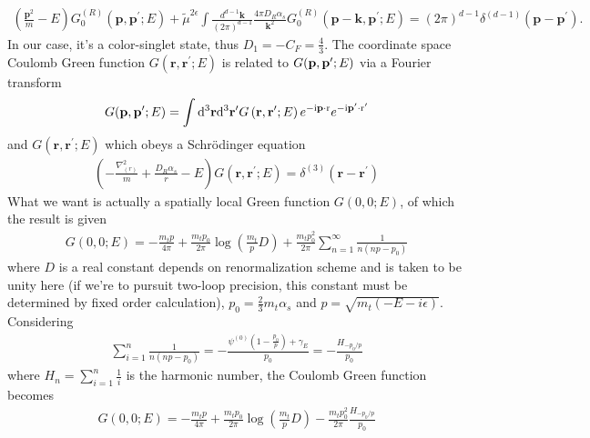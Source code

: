 \documentclass[english,aps,prd,preprint,showpacs,superscriptaddress,groupedaddress,fixfloats]{revtex4-1}
\begin{document}
\begin{align}
	\left(\frac{\mathbf{p}^{2}}{m}-E\right) G_{0}^{(R)}\left(\mathbf{p}, \mathbf{p}^{\prime} ; E\right)+\tilde{\mu}^{2 \epsilon} \int \frac{d^{d-1} \mathbf{k}}{(2 \pi)^{d-1}} \frac{4 \pi D_{R} \alpha_{s}}{\mathbf{k}^{2}} G_{0}^{(R)}\left(\mathbf{p}-\mathbf{k}, \mathbf{p}^{\prime} ; E\right) =(2 \pi)^{d-1} \delta^{(d-1)}\left(\mathbf{p}-\mathbf{p}^{\prime}\right).
\end{align}
In our case, it's a color-singlet state, thus $D_1=-C_F=\frac{4}{3}$. The coordinate space Coulomb Green function $G\left(\mathbf{r}, \mathbf{r}^{\prime}; E\right)$ is related to $G(\vb{p},\vb{p}';E)$ via a Fourier transform
\begin{align}
	G(\mathbf{p},\vb{p}' ; E)=\int \mathrm{d}^{3} \mathbf{r}\dd^3 \vb{r}' G\left(\mathbf{r}, \mathbf{r}^{\prime}; E\right) e^{-\mathrm{i} \mathbf{p}\cdot \mathrm{r}}e^{-\mathrm{i} \mathbf{p}' \cdot\mathrm{r}'}
\end{align}
and $G\left(\mathbf{r}, \mathbf{r}^{\prime}; E\right)$ which obeys a Schr\"odinger equation
\begin{align}
	\left(-\frac{\nabla_{(r)}^{2}}{m}+\frac{D_{R} \alpha_{s}}{r}-E\right) G\left(\mathbf{r}, \mathbf{r}^{\prime} ; E\right)=\delta^{(3)}\left(\mathbf{r}-\mathbf{r}^{\prime}\right)
\end{align}
What we want is actually a spatially local Green function $G(0,0;E)$, of which the result is given\cite{Fadin1987,Melnikov:1994jb}
\begin{align}
	G(0,0 ; E)=-\frac{m_{t} p}{4 \pi}+\frac{m_{t} p_{0}}{2 \pi} \log \left(\frac{m_{t}}{p} D\right)+\frac{m_{t} p_{0}^{2}}{2 \pi} \sum_{n=1}^{\infty} \frac{1}{n\left(n p-p_{0}\right)}
\end{align}
where $D$ is a real constant depends on renormalization scheme and is taken to be unity here (if we're to pursuit two-loop precision, this constant must be determined by fixed order calculation), $p_0=\frac{2}{3}m_t\alpha_s$ and $p=\sqrt{m_t\left( -E-i\epsilon \right)}$. Considering
\begin{align}
	\sum_{i=1}^{n} \frac{1}{n\left(n p-p_{0}\right)}=-\frac{\psi^{(0)}\left(1-\frac{p_{0}}{p}\right)+\gamma_E}{p_{0}}=-\frac{H_{-p_{0}/p}}{p_{0}}
\end{align}
where $H_n=\sum_{i=1}^n\frac{1}{i}$ is the harmonic number, the Coulomb Green function becomes
\begin{align}
	G(0,0 ; E)=-\frac{m_{t} p}{4 \pi}+\frac{m_{t} p_{0}}{2 \pi} \log \left(\frac{m_{t}}{p} D\right)-\frac{m_{t} p_{0}^{2}}{2 \pi}\frac{H_{-p_{0}/p}}{p_{0}}
\end{align}
\end{document}
